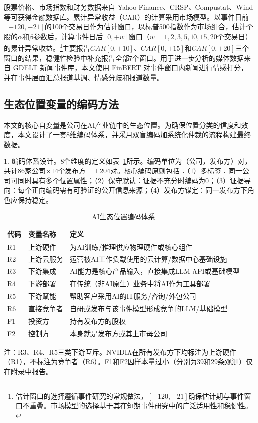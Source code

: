 \documentclass[11pt,fontset=fandol,a4paper]{ctexart}
\newcommand{\changed}[1]{{\color{orange!85!black}#1}}
\begin{document}
\changed{股票价格、市场指数和财务数据来自 Yahoo Finance、CRSP、Compustat、Wind 等可获得金融数据库。累计异常收益（CAR）的计算采用市场模型。以事件日前$[-120,-21]$的100个交易日作为估计窗口，以标普500指数作为市场组合，估计个股的$\alpha$和$\beta$参数后，计算事件日后$[0,+w]$窗口（$w=1,2,3,5,10,15,20$个交易日）的累计异常收益。\footnote{估计窗口的选择遵循事件研究的常规做法，$[-120,-21]$确保估计期与事件窗口不重叠。市场模型的选择基于其在短期事件研究中的广泛适用性和稳健性。}主要报告$CAR[0,+10]$、$CAR[0,+15]$和$CAR[0,+20]$三个窗口的结果，稳健性检验中补充报告全部7个窗口。用于进一步分析的媒体数据来自 GDELT 新闻事件库，本文使用 FinBERT 对事件窗口内新闻进行情感打分，并在事件层面汇总报道基调、情感分歧和报道数量。}

\subsection{生态位置变量的编码方法}

本文的核心自变量是公司在AI产业链中的生态位置。为确保位置分类的信度和效度，本文设计了一套8维编码体系，并采用双盲编码加系统化仲裁的流程构建最终数据。

1. 编码体系设计。8个维度的定义如表~\ref{tab:codebook}所示。编码单位为（公司，发布方）对，共计86家公司$\times$14个发布方$=$1\,204对。核心编码原则包括：（1）多标签：同一公司可同时具有多个位置属性；（2）保守默认：证据不充分时编码为0；（3）证据导向：每个正向编码需有可验证的公开信息来源；（4）发布方锚定：同一发布方下角色应保持稳定。

\begin{table}[H]
\centering
\small
\caption{AI生态位置编码体系}
\label{tab:codebook}
\begin{tabularx}{0.96\textwidth}{llX}
\toprule
代码 & 变量名称 & 定义 \\
\midrule
R1 & 上游硬件 & 为AI训练/推理供应物理硬件或核心组件 \\
R2 & 上游云服务 & 运营被AI工作负载使用的云计算/数据中心基础设施 \\
R3 & 下游集成 & AI能力是核心产品输入，直接集成LLM API或基础模型 \\
R4 & 下游部署 & 在传统（非AI原生）业务中将AI作为工具部署 \\
R5 & 下游赋能 & 帮助客户采用AI的IT服务/咨询/外包公司 \\
R6 & 直接竞争者 & 自研或发布与该事件模型形成竞争的LLM/基础模型 \\
F1 & 投资方 & 持有发布方的股权 \\
F2 & 控制方 & 本身就是发布方或其上市母公司 \\
\bottomrule
\end{tabularx}
\begin{minipage}{0.94\linewidth}
\vspace{0.4em}
\footnotesize
注：R3、R4、R5三类下游互斥。NVIDIA在所有发布方下均标注为上游硬件（R1），不标注为竞争者（R6）。F1和F2因样本量过小（分别为39和29条观测）仅在附录中报告。
\end{minipage}
\end{table}
\end{document}
